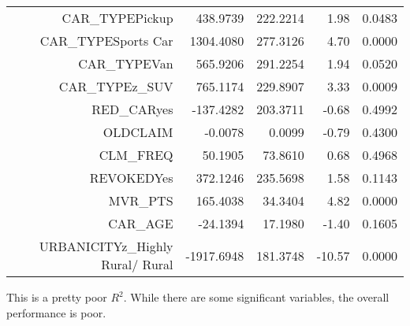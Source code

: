 \documentclass[]{article}
\begin{document}
\begin{tabular}{rrrrr}
$$  CAR\_TYPEPickup & 438.9739 & 222.2214 & 1.98 & 0.0483 \\ 
  CAR\_TYPESports Car & 1304.4080 & 277.3126 & 4.70 & 0.0000 \\ 
  CAR\_TYPEVan & 565.9206 & 291.2254 & 1.94 & 0.0520 \\ 
  CAR\_TYPEz\_SUV & 765.1174 & 229.8907 & 3.33 & 0.0009 \\ 
  RED\_CARyes & -137.4282 & 203.3711 & -0.68 & 0.4992 \\ 
  OLDCLAIM & -0.0078 & 0.0099 & -0.79 & 0.4300 \\ 
  CLM\_FREQ & 50.1905 & 73.8610 & 0.68 & 0.4968 \\ 
  REVOKEDYes & 372.1246 & 235.5698 & 1.58 & 0.1143 \\ 
  MVR\_PTS & 165.4038 & 34.3404 & 4.82 & 0.0000 \\ 
  CAR\_AGE & -24.1394 & 17.1980 & -1.40 & 0.1605 \\ 
  URBANICITYz\_Highly Rural/ Rural & -1917.6948 & 181.3748 & -10.57 & 0.0000 \\ 
   \hline
\end{tabular}

This is a pretty poor \(R^2\). While there are some significant
variables, the overall performance is poor.
\end{document}
